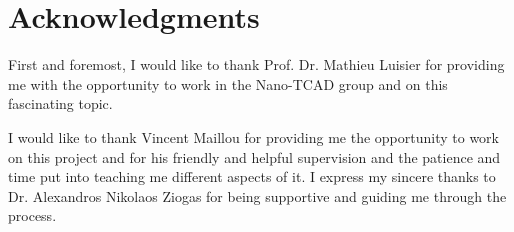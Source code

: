 \chapter*{Acknowledgments}

First and foremost, I would like to thank Prof. Dr. Mathieu Luisier for providing me with the opportunity to work in the Nano-TCAD group and on this fascinating topic.  

I would like to thank Vincent Maillou for providing me the opportunity to work on this project and for his friendly and helpful supervision and the patience and time put into teaching me different aspects of it. I express my sincere thanks to Dr. Alexandros Nikolaos Ziogas for being supportive and guiding me through the process.